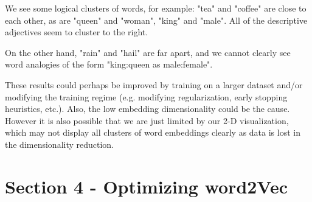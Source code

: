 \documentclass[12pt,letterpaper]{article}
\begin{document}
We see some logical clusters of words, for example: "tea" and "coffee" are close to each other, as are "queen" and "woman", "king" and "male". All of the descriptive adjectives seem to cluster to the right.

On the other hand, "rain" and "hail" are far apart, and we cannot clearly see word analogies of the form "king:queen as male:female".

These results could perhaps be improved by training on a larger dataset and/or modifying the training regime (e.g. modifying regularization, early stopping heuristics, etc.). Also, the low embedding dimensionality could be the cause. However it is also possible that we are just limited by our 2-D visualization, which may not display all clusters of word embeddings clearly as data is lost in the dimensionality reduction.

\section*{Section 4 - Optimizing word2Vec}
\end{document}

